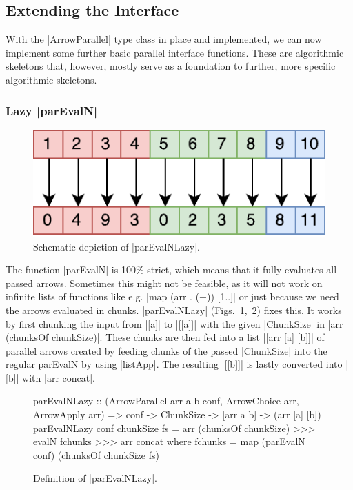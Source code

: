 \subsection{Extending the Interface}
\label{sec:extending-interface}
With the |ArrowParallel| type class in place and implemented, we can now implement some further basic parallel interface functions. These are algorithmic skeletons that, however, mostly serve as a foundation to further, more specific algorithmic skeletons.

\subsubsection{Lazy |parEvalN|}
\begin{figure}[tb]
	\includegraphics[scale=0.7]{images/parEvalNLazy}
	\caption{Schematic depiction of |parEvalNLazy|.}
	\label{fig:parEvalNLazyImg}
\end{figure}
The function |parEvalN| is 100\% strict, which means that it fully evaluates all passed arrows. Sometimes this might not be feasible, as it will not work on infinite lists of functions like e.g. |map (arr . (+)) [1..]| or just because we need the arrows evaluated in chunks. |parEvalNLazy| (Figs.~\ref{fig:parEvalNLazyImg},~\ref{fig:parEvalNLazy}) fixes this. It works by first chunking the input from |[a]| to |[[a]]| with the given |ChunkSize| in |arr (chunksOf chunkSize)|. These chunks are then fed into a list |[arr [a] [b]]| of parallel arrows created by feeding chunks of the passed |ChunkSize| into the regular parEvalN by using |listApp|. The resulting |[[b]]| is lastly converted into |[b]| with |arr concat|.
\begin{figure}[t]
\begin{code}
parEvalNLazy :: (ArrowParallel arr a b conf, ArrowChoice arr, ArrowApply arr) =>
	conf -> ChunkSize -> [arr a b] -> (arr [a] [b])
parEvalNLazy conf chunkSize fs =
	arr (chunksOf chunkSize) >>>
    evalN fchunks >>>
    arr concat
    where
      fchunks = map (parEvalN conf) (chunksOf chunkSize fs)
\end{code} %
\caption{Definition of |parEvalNLazy|.}
\label{fig:parEvalNLazy}
\end{figure}

